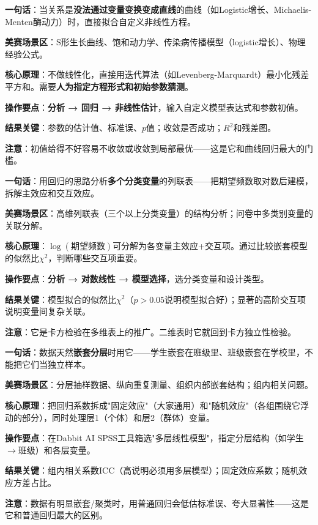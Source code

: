 
\begin{algobrief}
\textbf{一句话}：当关系是\textbf{没法通过变量变换变成直线}的曲线（如Logistic增长、Michaelis-Menten酶动力）时，直接拟合自定义非线性方程。

\textbf{美赛场景区}：S形生长曲线、饱和动力学、传染病传播模型（logistic增长）、物理经验公式。

\textbf{核心原理}：不做线性化，直接用迭代算法（如Levenberg-Marquardt）最小化残差平方和。需要\textbf{人为指定方程形式和初始参数猜测}。

\textbf{操作要点}：\textbf{分析 → 回归 → 非线性估计}，输入自定义模型表达式和参数初值。

\textbf{结果关键}：参数的估计值、标准误、$p$值；收敛是否成功；$R^2$和残差图。

\textbf{注意}：初值给得不好容易不收敛或收敛到局部最优——这是它和曲线回归最大的门槛。
\end{algobrief}


\begin{algobrief}
\textbf{一句话}：用回归的思路分析\textbf{多个分类变量}的列联表——把期望频数取对数后建模，拆解主效应和交互效应。

\textbf{美赛场景区}：高维列联表（三个以上分类变量）的结构分析；问卷中多类别变量的关联分解。

\textbf{核心原理}：$\log(\text{期望频数})$可分解为各变量主效应+交互项。通过比较嵌套模型的似然比$\chi^2$，判断哪些交互项重要。

\textbf{操作要点}：\textbf{分析 → 对数线性 → 模型选择}，选分类变量和设计类型。

\textbf{结果关键}：模型拟合的似然比$\chi^2$（$p>0.05$说明模型拟合好）；显著的高阶交互项说明变量间复杂关联。

\textbf{注意}：它是卡方检验在多维表上的推广。二维表时它就回到卡方独立性检验。
\end{algobrief}


\begin{algobrief}
\textbf{一句话}：数据天然\textbf{嵌套分层}时用它——学生嵌套在班级里、班级嵌套在学校里，不能把它们当独立样本。

\textbf{美赛场景区}：分层抽样数据、纵向重复测量、组织内部嵌套结构；组内相关问题。

\textbf{核心原理}：把回归系数拆成"固定效应"（大家通用）和"随机效应"（各组围绕它浮动的部分），同时处理层1（个体）和层2（群体）变量。

\textbf{操作要点}：在Dabbit AI SPSS工具箱选"多层线性模型"，指定分层结构（如学生$\to$班级）和各层变量。

\textbf{结果关键}：组内相关系数ICC（高说明必须用多层模型）；固定效应系数；随机效应方差占比。

\textbf{注意}：数据有明显嵌套/聚类时，用普通回归会低估标准误、夸大显著性——这是它和普通回归最大的区别。
\end{algobrief}

